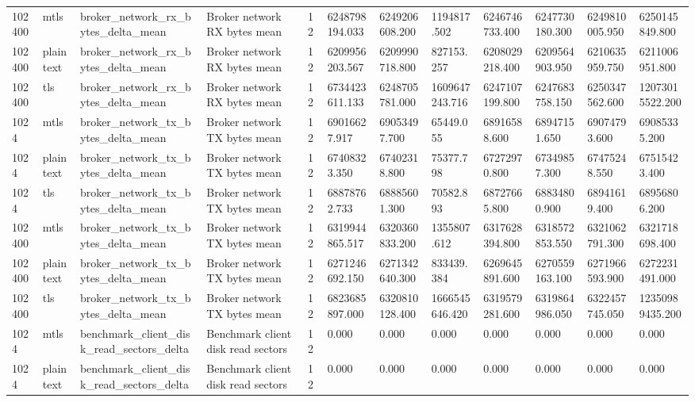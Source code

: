 \begin{longtable}{llllllllllll}
102400 & mtls & broker\_network\_rx\_bytes\_delta\_mean & Broker network RX bytes mean & 12 & 6248798194.033 & 6249206608.200 & 1194817.502 & 6246746733.400 & 6247730180.300 & 6249810005.950 & 6250145849.800 \\
102400 & plaintext & broker\_network\_rx\_bytes\_delta\_mean & Broker network RX bytes mean & 12 & 6209956203.567 & 6209990718.800 & 827153.257 & 6208029218.400 & 6209564903.950 & 6210635959.750 & 6211006951.800 \\
102400 & tls & broker\_network\_rx\_bytes\_delta\_mean & Broker network RX bytes mean & 12 & 6734423611.133 & 6248705781.000 & 1609647243.716 & 6247107199.800 & 6247683758.150 & 6250347562.600 & 12073015522.200 \\
1024 & mtls & broker\_network\_tx\_bytes\_delta\_mean & Broker network TX bytes mean & 12 & 69016627.917 & 69053497.700 & 65449.055 & 68916588.600 & 68947151.650 & 69074793.600 & 69085335.200 \\
1024 & plaintext & broker\_network\_tx\_bytes\_delta\_mean & Broker network TX bytes mean & 12 & 67408323.350 & 67402318.800 & 75377.798 & 67272970.800 & 67349857.300 & 67475248.550 & 67515423.400 \\
1024 & tls & broker\_network\_tx\_bytes\_delta\_mean & Broker network TX bytes mean & 12 & 68878762.733 & 68885601.300 & 70582.893 & 68727665.800 & 68834800.900 & 68941619.400 & 68956806.200 \\
102400 & mtls & broker\_network\_tx\_bytes\_delta\_mean & Broker network TX bytes mean & 12 & 6319944865.517 & 6320360833.200 & 1355807.612 & 6317628394.800 & 6318572853.550 & 6321062791.300 & 6321718698.400 \\
102400 & plaintext & broker\_network\_tx\_bytes\_delta\_mean & Broker network TX bytes mean & 12 & 6271246692.150 & 6271342640.300 & 833439.384 & 6269645891.600 & 6270559163.100 & 6271966593.900 & 6272231491.000 \\
102400 & tls & broker\_network\_tx\_bytes\_delta\_mean & Broker network TX bytes mean & 12 & 6823685897.000 & 6320810128.400 & 1666545646.420 & 6319579281.600 & 6319864986.050 & 6322457745.050 & 12350989435.200 \\
1024 & mtls & benchmark\_client\_disk\_read\_sectors\_delta & Benchmark client disk read sectors & 12 & 0.000 & 0.000 & 0.000 & 0.000 & 0.000 & 0.000 & 0.000 \\
1024 & plaintext & benchmark\_client\_disk\_read\_sectors\_delta & Benchmark client disk read sectors & 12 & 0.000 & 0.000 & 0.000 & 0.000 & 0.000 & 0.000 & 0.000 \\

\end{longtable}
